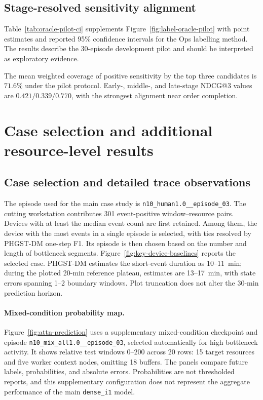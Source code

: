 \subsection{Stage-resolved sensitivity alignment}

Table~\ref{tab:oracle-pilot-ci} supplements Figure~\ref{fig:label-oracle-pilot} with point estimates and reported 95\% confidence intervals for the Ops labelling method. The results describe the 30-episode development pilot and should be interpreted as exploratory evidence.



The mean weighted coverage of positive sensitivity by the top three candidates is $71.6\%$ under the pilot protocol. Early-, middle-, and late-stage NDCG@3 values are $0.421/0.339/0.770$, with the strongest alignment near order completion. 

\FloatBarrier
\section{Case selection and additional resource-level results}\label{app:case-details}

\subsection{Case selection and detailed trace observations}

The episode used for the main case study is \texttt{n10\_human1.0\_\_episode\_03}. The cutting workstation contributes 301 event-positive window--resource pairs. Devices with at least the median event count are first retained. Among them, the device with the most events in a single episode is selected, with ties resolved by PHGST-DM one-step F1. Its episode is then chosen based on the number and length of bottleneck segments. Figure~\ref{fig:key-device-baselines} reports the selected case. PHGST-DM estimates the short-event duration as 10--11~min; during the plotted 20-min reference plateau, estimates are 13--17~min, with state errors spanning 1--2 boundary windows. Plot truncation does not alter the 30-min prediction horizon.

\paragraph*{Mixed-condition probability map.}
Figure~\ref{fig:attn-prediction} uses a supplementary mixed-condition checkpoint and episode \texttt{n10\_mix\_all1.0\_\_episode\_03}, selected automatically for high bottleneck activity. It shows relative test windows $0$--$200$ across 20 rows: 15 target resources and five worker context nodes, omitting 18 buffers. The panels compare future labels, probabilities, and absolute errors. Probabilities are not thresholded reports, and this supplementary configuration does not represent the aggregate performance of the main \texttt{dense\_i1} model.

